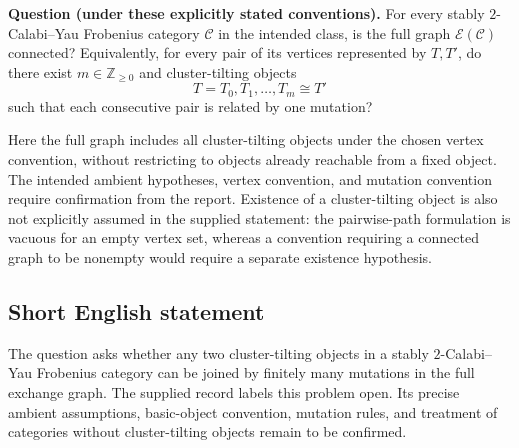 \documentclass[11pt]{article}
\newcommand{\Z}{\mathbb{Z}}
\begin{document}
\textbf{Question (under these explicitly stated conventions).} For every stably \(2\)-Calabi--Yau Frobenius category \(\mathcal C\) in the intended class, is the full graph \(\mathcal E(\mathcal C)\) connected? Equivalently, for every pair of its vertices represented by \(T,T'\), do there exist \(m\in\Z_{\geq 0}\) and cluster-tilting objects
\[
T=T_0,T_1,\ldots,T_m\cong T'
\]
such that each consecutive pair is related by one mutation?

Here the full graph includes all cluster-tilting objects under the chosen vertex convention, without restricting to objects already reachable from a fixed object. The intended ambient hypotheses, vertex convention, and mutation convention require confirmation from the report. Existence of a cluster-tilting object is also not explicitly assumed in the supplied statement: the pairwise-path formulation is vacuous for an empty vertex set, whereas a convention requiring a connected graph to be nonempty would require a separate existence hypothesis.
\subsection{Short English statement}
The question asks whether any two cluster-tilting objects in a stably \(2\)-Calabi--Yau Frobenius category can be joined by finitely many mutations in the full exchange graph. The supplied record labels this problem open. Its precise ambient assumptions, basic-object convention, mutation rules, and treatment of categories without cluster-tilting objects remain to be confirmed.
\end{document}
